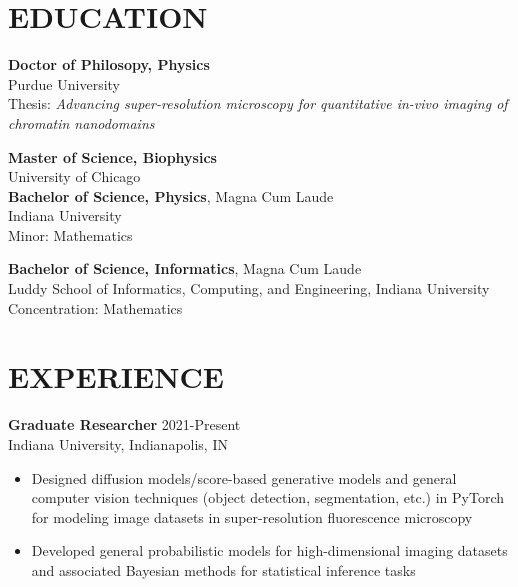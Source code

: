 \documentclass[margin, 10pt]{res} %
\begin{document}
\begin{resume}
\section{EDUCATION}

\textbf{Doctor of Philosopy, Physics}\\
Purdue University\\
Thesis: \textit{Advancing super-resolution microscopy for quantitative in-vivo imaging of chromatin nanodomains}

\textbf{Master of Science, Biophysics}\\
University of Chicago\\


\textbf{Bachelor of Science, Physics}, Magna Cum Laude\\
Indiana University\\
Minor: Mathematics 

\textbf{Bachelor of Science, Informatics}, Magna Cum Laude\\
Luddy School of Informatics, Computing, and Engineering, Indiana University\\
Concentration: Mathematics 
  
 
\section{EXPERIENCE}

\textbf{Graduate Researcher} \hfill 2021-Present \\
Indiana University, Indianapolis, IN

\begin{itemize} \itemsep -2pt %

\item Designed diffusion models/score-based generative models and general computer vision techniques (object detection, segmentation, etc.) in PyTorch for modeling image datasets in super-resolution fluorescence microscopy

\item Developed general probabilistic models for high-dimensional imaging datasets and associated Bayesian methods for statistical inference tasks


\end{itemize}
\end{resume}
\end{document}
